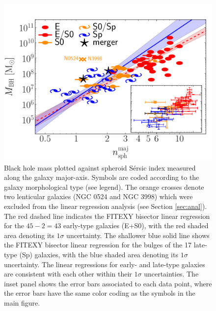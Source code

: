 \documentclass[preprint2]{emulateapj}
\begin{document}
\begin{figure}[h]
\begin{center}
\includegraphics[width=\columnwidth]{mbh_vs_n_maj.pdf}
\caption{Black hole mass plotted against spheroid S\'ersic index measured along the galaxy major-axis. 
Symbols are coded according to the galaxy morphological type (see legend). 
The orange crosses denote two lenticular galaxies (NGC 0524 and NGC 3998) which were excluded from the linear regression analysis 
(see Section \ref{sec:anal}). 
The red dashed line indicates the FITEXY bisector linear regression for the $45-2=43$  early-type galaxies (E+S0), 
with the red shaded area denoting its $1\sigma$ uncertainty. 
The shallower blue solid line shows the FITEXY bisector linear regression for the bulges of the 17 late-type (Sp) galaxies, 
with the blue shaded area denoting its $1\sigma$ uncertainty. 
The linear regressions for early- and late-type galaxies are consistent with each other within their $1\sigma$ uncertainties.  
The inset panel shows the error bars associated to each data point,  
where the error bars have the same color coding as the symbols in the main figure. 
}
\label{fig:mbhn}
\end{center}
\end{figure}
\end{document}
